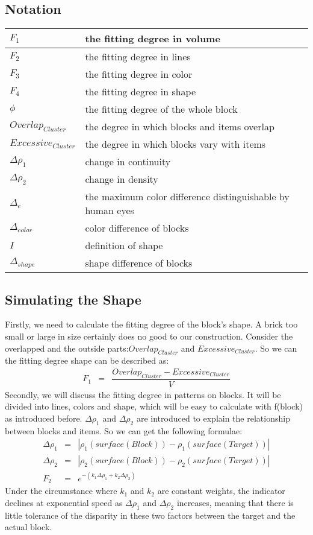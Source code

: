 \documentclass[12pt]{article}
\theoremstyle{definition}
\theoremstyle{remark}
\numberwithin{equation}{section}
\begin{document}
	\subsection{Notation}
	\begin{tabular}{|l|l|}
	\hline
	$F_1$&the fitting degree in volume\\
	\hline
	$F_2$&the fitting degree in lines\\
	\hline
	$F_3$&the fitting degree in color\\
	\hline
	$F_4$&the fitting degree in shape\\
	\hline
	$\phi$&the fitting degree of the whole block\\
	\hline
	$Overlap_{Cluster}$&the degree in which blocks and items overlap\\
	\hline
	$Excessive_{Cluster}$&the degree in which blocks vary with items\\
	\hline
	$\Delta{\rho_{1}}$&change in continuity\\
	\hline
	$\Delta{\rho_{2}}$&change in density\\
	\hline
	$\Delta_e$&the maximum color difference distinguishable by human eyes\\
	\hline
	$\Delta_{color}$&color difference of blocks\\
	\hline
	$I$&definition of shape\\
	\hline
	$\Delta_{shape}$&shape difference of blocks\\
	\hline
	\end{tabular}
	\subsection{Simulating the Shape}
		Firstly, we need to calculate the fitting degree of the block's shape. A brick too small or large  in size certainly does no good to our construction. Consider the overlapped and the outside parts:$Overlap_{Cluster}$ and $Excessive_{Cluster}$. So we can the fitting degree shape can be described as:
		\begin{align}
			F_1&=&\dfrac{Overlap_{Cluster}-Excessive_{Cluster}}{V}
		\end{align}
		Secondly, we will discuss the fitting degree in patterns on blocks. It will be divided into lines, colors and shape, which will be easy to calculate with f(block) as introduced before. $\Delta{\rho_{1}}$ and $\Delta{\rho_{2}}$ are introduced to explain the relationship between blocks and items. So we can get the following formulae:
		\begin{align}
			\Delta{\rho_{1}}&=&|\rho_{1}(surface(Block))-\rho_{1}(surface(Target))|\\
			\Delta{\rho_{2}}&=&|\rho_{2}(surface(Block))-\rho_{2}(surface(Target))|\\
			F_2&=&e^{-(k_1\Delta{\rho_{1}}+k_2\Delta{\rho_{2}})}
		\end{align}
		Under the circumstance where $k_1$ and $k_2$ are constant weights, the indicator declines at exponential speed as $\Delta\rho_1$ and $\Delta\rho_2$ increases, meaning that there is little tolerance of the disparity in these two factors between the target and the actual block.
		
\end{document}
